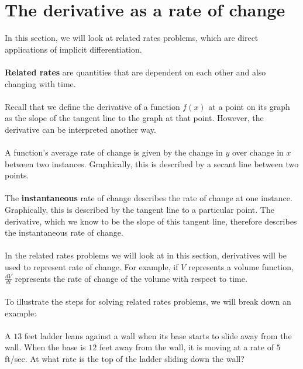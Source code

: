 \documentclass[11pt]{scrartcl}
\begin{document}
\maketitle
\noindent

\section{The derivative as a rate of change}
\noindent
In this section, we will look at related rates problems, which are direct applications of implicit differentiation. \\
\\
\noindent 
\textbf{Related rates} are quantities that are dependent on each other and also changing with time.\\
\noindent\\
Recall that we define the derivative of a function $f(x)$ at a point on its graph as the slope of the tangent line to the graph at that point. However, the derivative can be interpreted another way. \\
\\
\noindent 
A function's average rate of change is given by the change in $y$ over change in $x$ between two instances. Graphically, this is described by a secant line between two points. \\
\\
\noindent 
The \textbf{instantaneous} rate of change describes the rate of change at one instance. Graphically, this is described by the tangent line to a particular point. The derivative, which we know to be the slope of this tangent line, therefore describes the instantaneous rate of change. \\
\\
\noindent 
In the related rates problems we will look at in this section, derivatives will be used to represent rate of change. For example, if $V$ represents a volume function, $\frac{dV}{dt}$ represents the rate of change of the volume with respect to time. \\
\\
\noindent 
To illustrate the steps for solving related rates problems, we will break down an example:\\
\noindent\\
A $13$ feet ladder leans against a wall when its base starts to slide away from the wall. When the base is $12$ feet away from the wall, it is moving at a rate of $5$ ft/sec. At what rate is the top of the ladder sliding down the wall?\\
\end{document}
